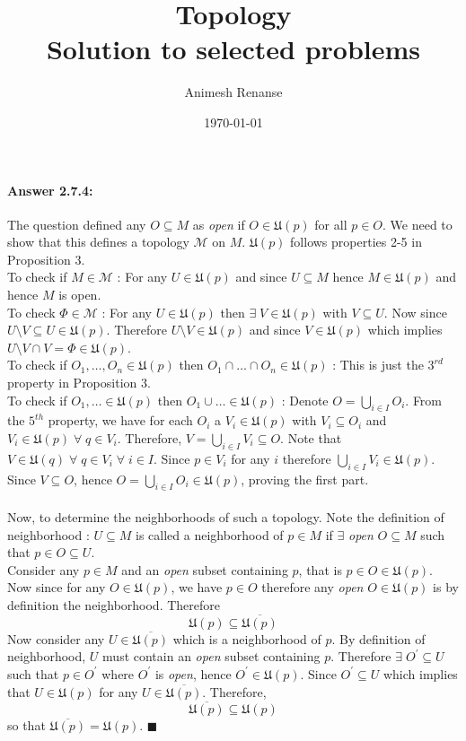 \documentclass{article}
\title{Topology \large\\
	 Solution to selected problems }
\author{Animesh Renanse}
\date{\today}
\theoremstyle{definition}
\theoremstyle{remark}
\theoremstyle{definition}
\theoremstyle{definition}
\newenvironment{customproof}[1]{\paragraph{Answer #1:}}{\hfill\ensuremath{\blacksquare}}
\newcommand{\intrs}{\cap}
\newcommand{\topo}[1]{\mathcal{#1}}
\newcommand{\nbdsys}[2]{\mathfrak{#1}(#2)}
\newcommand{\union}[0]{\cup}
\begin{document}
	
	\maketitle
	\begin{customproof}{2.7.4}
		The question defined any $ O\subseteq M $ as \emph{open} if $ O\in \nbdsys{U}{p} $ for all $ p\in O $. We need to show that this defines a topology $ \topo{M} $ on $ M $. $ \nbdsys{U}{p} $ follows properties 2-5 in Proposition 3.\\
		To check if $ M\in \topo{M} $ : For any $ U \in \nbdsys{U}{p} $ and since $ U\subseteq M $ hence $ M\in \nbdsys{U}{p} $ and hence $ M $ is open.\\
		To check $ \Phi \in \topo{M} $ : For any $ U\in \nbdsys{U}{p} $ then $ \exists \;V\in \nbdsys{U}{p} $ with $ V\subseteq U $. Now since $ U\setminus V \subseteq U \in \nbdsys{U}{p} $. Therefore $ U\setminus V \in \nbdsys{U}{p} $ and since $ V\in \nbdsys{U}{p} $ which implies $ U\setminus V \intrs V = \Phi \in \nbdsys{U}{p} $.\\
		To check if $ O_1,\dots,O_n \in \nbdsys{U}{p}$ then $ O_1\intrs \dots\intrs O_n \in \nbdsys{U}{p} $ : This is just the $ 3^{rd} $ property in Proposition 3.\\
		To check if $ O_1,\dots\in \nbdsys{U}{p}$ then $ O_1 \union \dots \in \nbdsys{U}{p} $ : Denote $ O = \bigcup_{i\in I} O_i $. From the $ 5^{th} $ property, we have for each $ O_i $ a $ V_i \in \nbdsys{U}{p} $ with $ V_i \subseteq O_i $ and $ V_i \in \nbdsys{U}{p} \;\forall\;q\in V_i$. Therefore, $ V  =\bigcup_{i\in I} V_i \subseteq O $. Note that $ V \in \nbdsys{U}{q} \;\forall\;q\in V_i\;\forall\;i\in I$. Since $ p\in V_i $ for any $ i $ therefore $ \bigcup_{i\in I} V_i \in \nbdsys{U}{p} $. Since $ V\subseteq O $, hence $ O = \bigcup_{i\in I} O_i \in \nbdsys{U}{p}  $, proving the first part.\\\\
		Now, to determine the neighborhoods of such a topology. Note the definition of neighborhood : $ U\subseteq M $ is called a neighborhood of $ p\in M $ if $ \exists $ \emph{open} $ O\subseteq M $ such that $ p\in O \subseteq U $. \\
		Consider any $ p\in M $ and an \emph{open} subset containing $ p $, that is $ p\in O \in \nbdsys{U}{p} $. Now since for any $ O \in \nbdsys{U}{p} $, we have $ p\in O $ therefore any \emph{open} $ O\in \nbdsys{U}{p} $ is by definition the neighborhood. Therefore
		\[\nbdsys{U}{p}\subseteq \overline{\nbdsys{U}{p}}\]
		Now consider any $ U \in \overline{\nbdsys{U}{p}} $ which is a neighborhood of $ p $. By definition of neighborhood, $ U $ must contain an \emph{open} subset containing $ p $. Therefore $ \exists \;O^\prime \subseteq U $ such that $ p\in O^\prime $ where $ O^\prime $ is \emph{open}, hence $ O^\prime \in \nbdsys{U}{p} $. Since $ O^\prime \subseteq U $ which implies that $ U\in \nbdsys{U}{p} $ for any $ U\in \overline{\nbdsys{U}{p}} $. Therefore,
		\[\overline{\nbdsys{U}{p}}\subseteq \nbdsys{U}{p}\]
		so that $ \overline{\nbdsys{U}{p}} = \nbdsys{U}{p} $.
	\end{customproof}

\hrulefill
\end{document}
